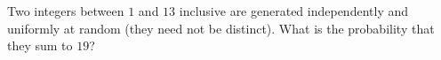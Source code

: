 Two integers between $1$ and $13$ inclusive are generated independently and uniformly at random (they need not be distinct). What is the probability that they sum to $19$?
